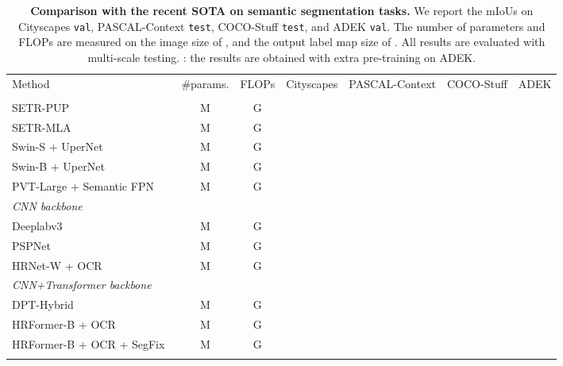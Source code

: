 \documentclass{article}
\begin{document}
\renewcommand{\arraystretch}{1.1}
\begin{table}[h]
  \centering
  \footnotesize
  \setlength{\tabcolsep}{1pt}
  \renewcommand{\arraystretch}{1.3}
  \caption{\textbf{Comparison with the recent SOTA on semantic segmentation tasks.}
    We report the mIoUs on Cityscapes \texttt{val}, PASCAL-Context \texttt{test}, COCO-Stuff \texttt{test}, and ADEK \texttt{val}.
    The number of parameters and FLOPs are measured
    on the image size of ,
    and the output label map size of .
    All results are evaluated with multi-scale testing.
    : the results are obtained with extra pre-training on ADEK.
  }
  {
    \begin{tabular}{l|cc|cccc}
      \shline
      Method                                          & \#params. & FLOPs      & {Cityscapes} & {PASCAL-Context} & {COCO-Stuff} & ADEK \\
      \shline
      \multicolumn{6}{l}{\emph{Transformer backbone}}                                                                                      \\\hline
      SETR-PUP~\cite{SETR}                            & M  & G  &        &            &           &    \\
      SETR-MLA~\cite{SETR}                            & M  & G  &           &            &           &    \\
      Swin-S + UperNet~\cite{liu2021swin}             & M  & G &           &               &           &    \\
      Swin-B + UperNet~\cite{liu2021swin}             & M & G &           &               &           &    \\
      PVT-Large + Semantic FPN~\cite{wang2021pyramid} & M   & G       &           &               &           &    \\
      \hline
      \multicolumn{6}{l}{\emph{CNN backbone}}                                                                                              \\\hline
      Deeplabv3~\cite{chen2017rethinking}             & M   & G  &        &            &           &       \\
      PSPNet~\cite{zhao2017pyramid}                   & M   & G  &        &            &        &       \\
      HRNet-W + OCR~\cite{yuan2019object}         & M   & G   &           &            &        &    \\ \hline
      \multicolumn{6}{l}{\emph{CNN+Transformer backbone}}                                                                                  \\\hline
      DPT-Hybrid~\cite{Ranftl2021}                    & M  & G  &           &    &           &    \\
      HRFormer-B + OCR                                & M   & G  &      &          &        &    \\
      HRFormer-B + OCR + SegFix~\cite{yuan2020segfix} & M   & G  &      &               &           &       \\
      \shline
    \end{tabular}
  }
  \label{tab:seg_result}
\end{table}
\end{document}
